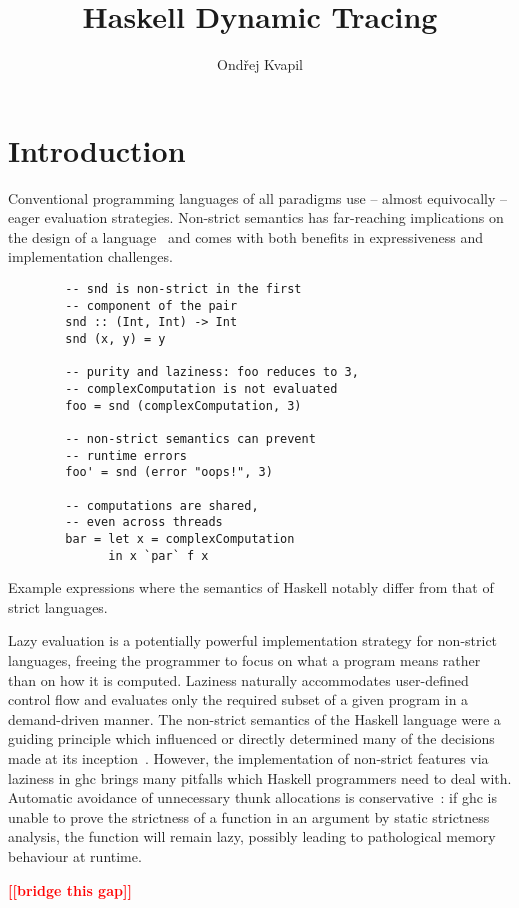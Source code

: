 \documentclass[thesis=B,english]{FITthesis}[2019/12/23]
\title{Haskell Dynamic Tracing}
\author{Ondřej Kvapil} %
\newcommand{\todo}[1]{\textcolor{red}{\textbf{[[#1]]}}}
\begin{document}
\chapter{Introduction} \label{sec:intro}
Conventional programming languages of all paradigms use -- almost equivocally
-- eager evaluation strategies. Non-strict semantics has far-reaching
implications on the design of a language~\cite{haskell-is-pure} and comes with
both benefits in expressiveness and implementation challenges.

\begin{listing}[h]
	\centering
	\begin{verbatim}
		-- snd is non-strict in the first
		-- component of the pair
		snd :: (Int, Int) -> Int
		snd (x, y) = y

		-- purity and laziness: foo reduces to 3,
		-- complexComputation is not evaluated
		foo = snd (complexComputation, 3)

		-- non-strict semantics can prevent
		-- runtime errors
		foo' = snd (error "oops!", 3)

		-- computations are shared,
		-- even across threads
		bar = let x = complexComputation
		      in x `par` f x
	\end{verbatim}
	\caption[Example lazy expressions.]{Example expressions where the semantics
	of Haskell notably differ from that of strict languages.}
	\label{lst:let-x}
\end{listing}

Lazy evaluation is a potentially powerful implementation strategy
for non-strict languages, freeing the programmer to focus on what a program
means rather than on how it is computed. Laziness naturally accommodates
user-defined control flow and evaluates only the required subset of a given
program in a demand-driven manner. The non-strict semantics of the Haskell
language were a guiding principle which influenced or directly determined many
of the decisions made at its inception~\cite{history-of-haskell}. However, the
implementation of non-strict features via laziness in \acrshort{ghc} brings
many pitfalls which Haskell programmers need to deal with. Automatic avoidance
of unnecessary thunk allocations is conservative~\cite{cmtary-demand-analysis}:
if \acrshort{ghc} is unable to prove the strictness of a function in an
argument by static strictness analysis, the function will remain lazy, possibly
leading to pathological memory behaviour at runtime.

\todo{bridge this gap}
\end{document}
